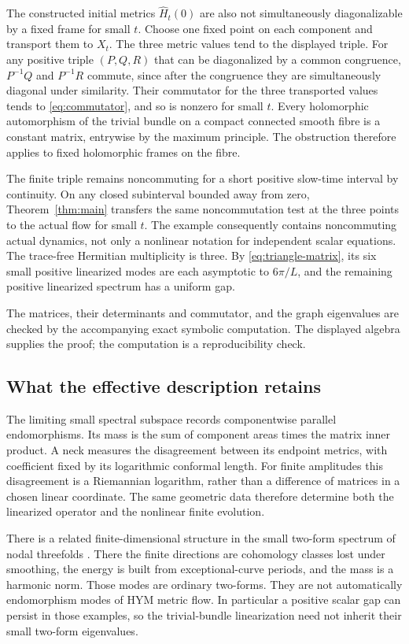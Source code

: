 The constructed initial metrics $\widehat H_t(0)$ are also not
simultaneously diagonalizable by a fixed frame for small $t$.
Choose one fixed point on each component and transport them to
$X_t$. The three metric values tend to the displayed triple. For
any positive triple $(P,Q,R)$ that can be diagonalized by a common
congruence, $P^{-1}Q$ and $P^{-1}R$ commute, since after the
congruence they are simultaneously diagonal under similarity.
Their commutator for the three transported values tends to
\eqref{eq:commutator}, and so is nonzero for small $t$.
Every holomorphic automorphism of the trivial bundle on a compact
connected smooth fibre is a constant matrix, entrywise by the
maximum principle. The obstruction therefore applies to fixed
holomorphic frames on the fibre.

The finite triple remains noncommuting for a short positive
slow-time interval by continuity. On any closed subinterval bounded
away from zero, Theorem~\ref{thm:main} transfers the same
noncommutation test at the three points to the actual flow for small
$t$. The example consequently contains noncommuting actual dynamics,
not only a nonlinear notation for independent scalar equations.
The trace-free Hermitian multiplicity is three. By
\eqref{eq:triangle-matrix}, its six small positive linearized modes
are each asymptotic to $6\pi/L$, and the remaining positive
linearized spectrum has a uniform gap.

The matrices, their determinants and commutator, and the graph
eigenvalues are checked by the accompanying exact symbolic
computation. The displayed algebra supplies the proof; the
computation is a reproducibility check.

\subsection{What the effective description retains}
The limiting small spectral subspace records componentwise parallel endomorphisms.
Its mass is the sum of component areas times the matrix inner
product. A neck measures the disagreement between its endpoint
metrics, with coefficient fixed by its logarithmic conformal
length. For finite amplitudes this disagreement is a Riemannian
logarithm, rather than a difference of matrices in a chosen linear
coordinate. The same geometric data therefore determine both the
linearized operator and the nonlinear finite evolution.

There is a related finite-dimensional structure in the small
two-form spectrum of nodal threefolds
\cite{wuebben-conifold,wuebben-nodal}. There the finite directions
are cohomology classes lost under smoothing, the energy is built
from exceptional-curve periods, and the mass is a harmonic norm.
Those modes are ordinary two-forms. They are not automatically
endomorphism modes of HYM metric flow. In particular a positive
scalar gap can persist in those examples, so the trivial-bundle
linearization need not inherit their small two-form eigenvalues.

